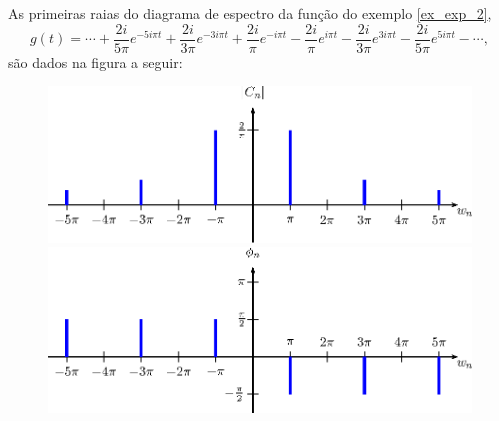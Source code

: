 \begin{ex} As primeiras raias do diagrama de espectro da função do exemplo \ref{ex_exp_2},
\begin{equation}
g(t)=\cdots+\frac{2i}{5\pi}e^{-5i\pi t}+\frac{2i}{3\pi}e^{-3i\pi t}+\frac{2i}{\pi}e^{-i\pi t}-\frac{2i}{\pi}e^{i\pi t}-\frac{2i}{3\pi}e^{3i\pi t}-\frac{2i}{5\pi}e^{5i\pi t}-\cdots,
\end{equation}
são dados na figura a seguir:
\begin{figure}[!ht] 
\includegraphics{cap_diagramas_espectro/pics/figura_4}
\includegraphics{cap_diagramas_espectro/pics/figura_5}
\end{figure}
\end{ex}



